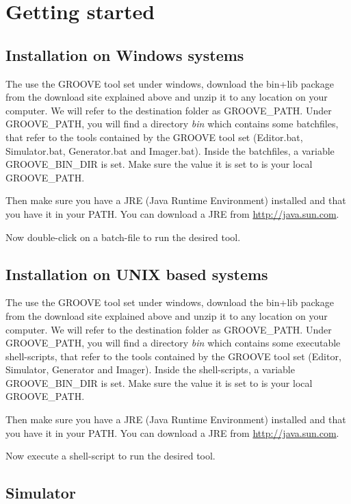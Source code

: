 \section{Getting started}

\subsection{Installation on Windows systems}

The use the GROOVE tool set under windows, download the bin+lib package from the download site explained above and unzip it to any location on your computer. We will refer to the destination folder as GROOVE\_PATH. Under GROOVE\_PATH, you will find a directory \emph{bin} which contains some batchfiles, that refer to the tools contained by the GROOVE tool set (Editor.bat, Simulator.bat, Generator.bat and Imager.bat). Inside the batchfiles, a variable GROOVE\_BIN\_DIR is set. Make sure the value it is set to is your local GROOVE\_PATH.

Then make sure you have a JRE (Java Runtime Environment) installed and that you have it in your PATH. You can download a JRE from \url{http://java.sun.com}.

Now double-click on a batch-file to run the desired tool.

\subsection{Installation on UNIX based systems}

The use the GROOVE tool set under windows, download the bin+lib package from the download site explained above and unzip it to any location on your computer. We will refer to the destination folder as GROOVE\_PATH. Under GROOVE\_PATH, you will find a directory \emph{bin} which contains some executable shell-scripts, that refer to the tools contained by the GROOVE tool set (Editor, Simulator, Generator and Imager). Inside the shell-scripts, a variable GROOVE\_BIN\_DIR is set. Make sure the value it is set to is your local GROOVE\_PATH.

Then make sure you have a JRE (Java Runtime Environment) installed and that you have it in your PATH. You can download a JRE from \url{http://java.sun.com}.

Now execute a shell-script to run the desired tool.

\subsection{Simulator}

